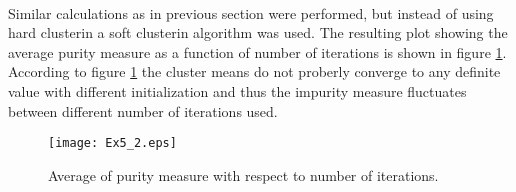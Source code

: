 \documentclass[article,11pt]{article}
\begin{document}
 
\\
Similar calculations as in previous section were performed, but instead of
using hard clusterin a soft clusterin algorithm was used. The resulting plot
showing the average purity measure as a function of number of iterations is
shown in figure \ref{fig:plot2}. According to figure \ref{fig:plot2} the cluster
means do not proberly converge to any definite value with different
initialization and thus the impurity measure fluctuates between different number
of iterations used.
\begin{figure}[!h]
  \centering
  \texttt{[image: Ex5\_2.eps]}
  \caption{Average of purity measure with respect to number of
    iterations.}
  \label{fig:plot2}
\end{figure}
\end{document}
